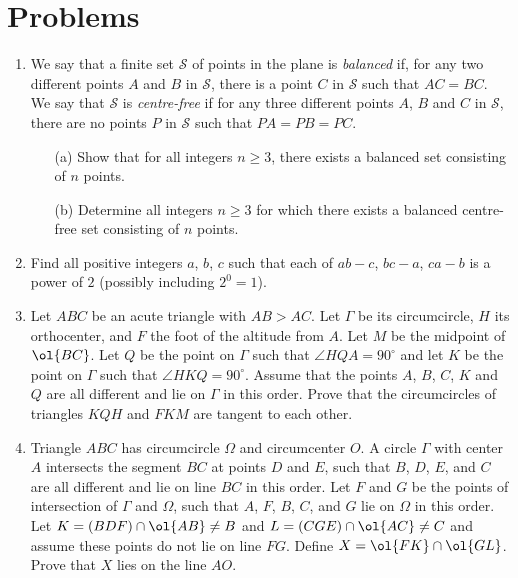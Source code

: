 \documentclass[11pt]{scrartcl}
\begin{document}
\section{Problems}
\begin{enumerate}[\bfseries 1.]
\item %
We say that a finite set $\mathcal{S}$ of points in the plane
is \emph{balanced} if,
for any two different points $A$ and $B$ in $\mathcal{S}$,
there is a point $C$ in $\mathcal{S}$ such that $AC=BC$.
We say that $\mathcal{S}$ is \emph{centre-free} if for
any three different points $A$, $B$ and $C$ in $\mathcal{S}$,
there are no points $P$ in $\mathcal{S}$ such that $PA=PB=PC$.

\begin{enumerate}
\item[(a)] Show that for all integers $n\ge 3$,
  there exists a balanced set consisting of $n$ points.
\item[(b)] Determine all integers $n\ge 3$ for which
  there exists a balanced centre-free set consisting of $n$ points.
\end{enumerate}

\item %
Find all positive integers $a$, $b$, $c$ such that
each of $ab-c$, $bc-a$, $ca-b$ is a power of $2$
(possibly including $2^0=1$).

\item %
Let $ABC$ be an acute triangle with $AB > AC$.
Let $\Gamma$ be its circumcircle, $H$ its orthocenter,
and $F$ the foot of the altitude from $A$.
Let $M$ be the midpoint of $\ol{BC}$.
Let $Q$ be the point on $\Gamma$ such that $\angle HQA = 90^{\circ}$
and let $K$ be the point on $\Gamma$ such that $\angle HKQ = 90^{\circ}$.
Assume that the points $A$, $B$, $C$, $K$ and $Q$
are all different and lie on $\Gamma$ in this order.
Prove that the circumcircles of triangles $KQH$ and $FKM$
are tangent to each other.

\item %
Triangle $ABC$ has circumcircle $\Omega$ and circumcenter $O$.
A circle $\Gamma$ with center $A$
intersects the segment $BC$ at points $D$ and $E$,
such that $B$, $D$, $E$, and $C$ are all different
and lie on line $BC$ in this order.
Let $F$ and $G$ be the points of intersection of $\Gamma$ and $\Omega$,
such that $A$, $F$, $B$, $C$, and $G$ lie on $\Omega$ in this order.
Let $K = (BDF) \cap \ol{AB} \neq B$
and $L = (CGE) \cap \ol{AC} \neq C$
and assume these points do not lie on line $FG$.
Define $X = \ol{FK} \cap \ol{GL}$.
Prove that $X$ lies on the line $AO$.


\end{enumerate}
\end{document}
